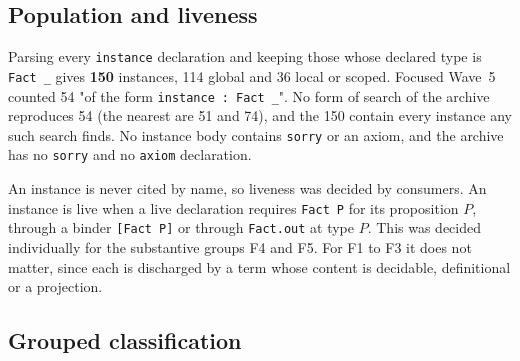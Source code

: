 \documentclass[11pt]{article}
\newcommand{\lean}[1]{\nolinkurl{#1}}
\theoremstyle{remark}
\begin{document}
\subsection{Population and liveness}

Parsing every \lean{instance} declaration and keeping those whose declared type is \lean{Fact}~\lean{_} gives \textbf{150} instances, 114 global and 36 local or scoped. Focused Wave~5 counted 54 "of the form \lean{instance}~\lean{:}~\lean{Fact}~\lean{_}". No form of search of the archive reproduces 54 (the nearest are 51 and 74), and the 150 contain every instance any such search finds. No instance body contains \lean{sorry} or an axiom, and the archive has no \lean{sorry} and no \lean{axiom} declaration.

An instance is never cited by name, so liveness was decided by consumers. An instance is live when a live declaration requires \lean{Fact}~\lean{P} for its proposition $P$, through a binder \lean{[Fact}~\lean{P]} or through \lean{Fact.out} at type $P$. This was decided individually for the substantive groups F4 and F5. For F1 to F3 it does not matter, since each is discharged by a term whose content is decidable, definitional or a projection.

\subsection{Grouped classification}
\end{document}
